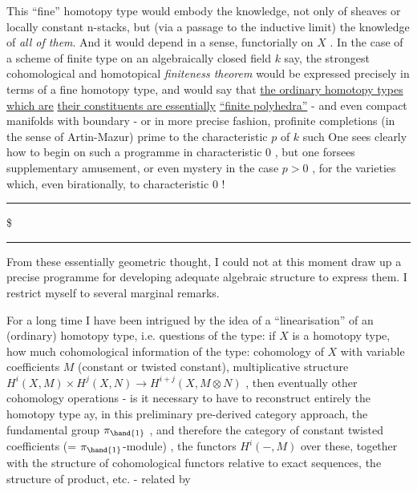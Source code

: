 
This ``fine'' homotopy type would embody the knowledge, not only of sheaves
or locally constant n-stacks, but (via a passage to the inductive limit)
the knowledge of \emph{all of them}. And it would depend\hand{,} in a  sense,
functorially on $X$ . In the case of a scheme of finite type on an
algebraically closed field $k$ say, the strongest cohomological and
homotopical \emph{finiteness theorem} would be expressed precisely in terms of a
fine homotopy type, and would say that \uline{the ordinary homotopy types which are}
\uline{their constituents are essentially} \uline{``finite polyhedra''} - and even compact
manifolds with boundary - or in more precise fashion,  profinite completions
(in the sense of Artin-Mazur) prime to the characteristic $p$ of $k$  
 such   One sees clearly how to begin on such a programme in
characteristic $0$ , but one forsees supplementary amusement, or even 
mystery\hand{,} in the case $p > 0$ , for the varieties which, even birationally,  
  to characteristic $0$ !

\noindent\rule{2cm}{0.4pt}\$\rule{2cm}{0.4pt}

 From these essentially geometric thought, I could not at this moment
draw up a precise programme for developing  adequate algebraic structure
to express them. I restrict myself to several marginal remarks.

For a long time I have been intrigued by the idea of a ``linearisation''
of an (ordinary) homotopy type, i.e. questions of the type: if $X$ is a
homotopy type, how much cohomological information of the type: cohomology
of $X$ with variable coefficients $M$ (constant or twisted constant),
multiplicative structure $H^i(X, M) \times H^j(X, N) \to H^{i+j}(X, M \otimes N)$ , then
eventually other cohomology operations - is it necessary to have to reconstruct
entirely the homotopy type ay, in this preliminary pre-derived category
approach,   the fundamental group $\pi_{\hand{1}}$ , and therefore the
category of constant twisted coefficients (= $\pi_{\hand{1}}$-module) , the functors
$H^i(-, M)$ over these, together with the structure of cohomological functors
relative to exact sequences, the structure of  product, etc. - related by

